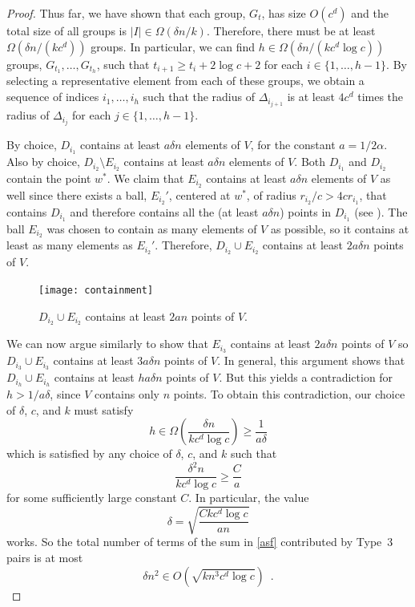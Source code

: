 \documentclass{patmorin}
\begin{document}
\begin{proof}
  Thus far, we have shown that each group, $G_t$, has size $O(c^d)$
  and the total size of all groups is $|I|\in\Omega(\delta n/k)$.
  Therefore, there must be at least $\Omega(\delta n/(kc^d))$ groups.
  In particular, we can find $h\in\Omega(\delta n/(kc^d\log c))$ groups,
  $G_{t_1},\ldots,G_{t_h}$, such that $t_{i+1} \ge t_{i}+2\log c+2$ for
  each $i\in\{1,\ldots,h-1\}$.  By selecting a representative element from
  each of these groups, we obtain a sequence of indices $i_1,\ldots,i_h$
  such that the radius of $\Delta_{i_{j+1}}$ is at least $4c^d$ times
  the radius of $\Delta_{i_j}$ for each $j\in\{1,\ldots,h-1\}$.

  By choice, $D_{i_1}$ contains at least $ a \delta n$ elements of
  $V$, for the constant $a=1/2\alpha$.  Also by choice, $D_{i_2}\setminus
  E_{i_2}$ contains at least $ a \delta n$ elements of $V$.
  Both $D_{i_1}$ and $D_{i_2}$ contain the point $w^*$.  We claim
  that $E_{i_2}$ contains at least $ a \delta n$ elements of $V$
  as well since there exists a ball, $E_{i_2}'$, centered at $w^*$,
  of radius $r_{i_2}/c > 4cr_{i_1}$, that contains $D_{i_1}$ and
  therefore contains all the (at least $ a\delta n$) points in $D_{i_1}$
  (see ).  The ball $E_{i_2}$ was chosen to contain
  as many elements of $V$ as possible, so it contains at least as many
  elements as $E_{i_2}'$.  Therefore, $D_{i_2}\cup E_{i_2}$ contains at
  least $2 a  \delta n$ points of $V$.

  \begin{figure}
     \begin{center}
       \texttt{[image: containment]}
     \end{center}
     \caption{$D_{i_2}\cup E_{i_2}$ contains at least $2 a  n$ 
              points of $V$.}
   \end{figure}

  We can now argue similarly to show that $E_{i_3}$ contains at
  least $2 a \delta n$ points of $V$ so $D_{i_3}\cup E_{i_3}$
  contains at least $3 a \delta n$ points of $V$.  In general,
  this argument shows that $D_{i_h}\cup E_{i_h}$ contains at least
  $h a \delta n$ points of $V$.  But this yields a contradiction for
  $h> 1/ a \delta$, since $V$ contains only $n$ points.  To obtain
  this contradiction, our choice of $\delta$, $c$, and $k$ must satisfy
  \[
       h\in\Omega\left(\frac{\delta n}{kc^d\log c}\right) \ge
          \frac{1}{ a  \delta}
  \]
  which is satisfied by any choice of $\delta$, $c$, and $k$ such that
  \[
       \frac{\delta^2 n}{kc^d\log c} \ge \frac{C}{a}
  \]
  for some sufficiently large constant $C$.  In particular, the value
  \[
       \delta = \sqrt{\frac{Ckc^d\log c}{an}}
  \]
  works.  So the total number of terms of the sum in \eqref{asf}
  contributed by Type~3 pairs is at most
  \[
    \delta n^2 \in O\left(\sqrt{kn^3c^d\log c}\right) \enspace .
  \]


\end{proof}
\end{document}
